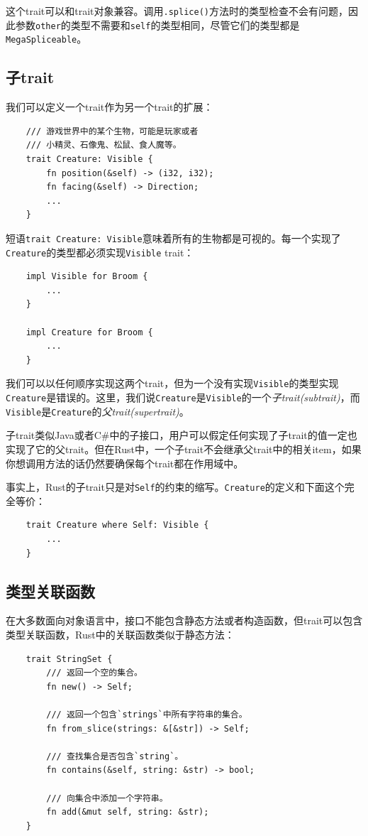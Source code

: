 这个trait可以和trait对象兼容。调用\texttt{.splice()}方法时的类型检查不会有问题，因此参数\texttt{other}的类型不需要和\texttt{self}的类型相同，尽管它们的类型都是\texttt{MegaSpliceable}。

\subsection{子trait}\label{subtrait}
我们可以定义一个trait作为另一个trait的扩展：
\begin{verbatim}
    /// 游戏世界中的某个生物，可能是玩家或者
    /// 小精灵、石像鬼、松鼠、食人魔等。
    trait Creature: Visible {
        fn position(&self) -> (i32, i32);
        fn facing(&self) -> Direction;
        ...
    }
\end{verbatim}

短语\texttt{trait Creature: Visible}意味着所有的生物都是可视的。每一个实现了\texttt{Creature}的类型都必须实现\texttt{Visible} trait：
\begin{verbatim}
    impl Visible for Broom {
        ...
    }

    impl Creature for Broom {
        ...
    }
\end{verbatim}
我们可以以任何顺序实现这两个trait，但为一个没有实现\texttt{Visible}的类型实现\texttt{Creature}是错误的。这里，我们说\texttt{Creature}是\texttt{Visible}的一个\emph{子trait(subtrait)}，而\texttt{Visible}是\texttt{Creature}的\emph{父trait(supertrait)}。

子trait类似Java或者C\#中的子接口，用户可以假定任何实现了子trait的值一定也实现了它的父trait。但在Rust中，一个子trait不会继承父trait中的相关item，如果你想调用方法的话仍然要确保每个trait都在作用域中。

事实上，Rust的子trait只是对\texttt{Self}的约束的缩写。\texttt{Creature}的定义和下面这个完全等价：
\begin{verbatim}
    trait Creature where Self: Visible {
        ...
    }
\end{verbatim}

\subsection{类型关联函数}
在大多数面向对象语言中，接口不能包含静态方法或者构造函数，但trait可以包含类型关联函数，Rust中的关联函数类似于静态方法：
\begin{verbatim}
    trait StringSet {
        /// 返回一个空的集合。
        fn new() -> Self;
        
        /// 返回一个包含`strings`中所有字符串的集合。
        fn from_slice(strings: &[&str]) -> Self;

        /// 查找集合是否包含`string`。
        fn contains(&self, string: &str) -> bool;

        /// 向集合中添加一个字符串。
        fn add(&mut self, string: &str);
    }
\end{verbatim}

